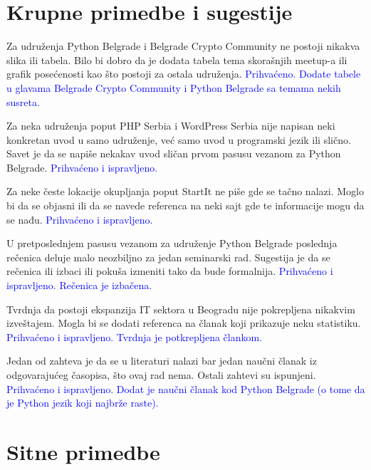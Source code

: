 \documentclass[a4paper]{report}
\newcommand{\odgovor}[1]{\textcolor{blue}{#1}}
\begin{document}
\section{Krupne primedbe i sugestije}

Za udruženja Python Belgrade i Belgrade Crypto Community ne postoji nikakva slika ili tabela. Bilo bi dobro da je dodata tabela tema skorašnjih meetup-a ili grafik posećenosti kao što postoji za ostala udruženja.
\odgovor{Prihvaćeno. Dodate tabele u glavama Belgrade Crypto Community i Python Belgrade sa temama nekih susreta.}

Za neka udruženja poput PHP Serbia i WordPress Serbia nije napisan neki konkretan uvod u samo udruženje, već samo uvod u programski jezik ili slično. Savet je da se napiše nekakav uvod sličan prvom pasusu vezanom za Python Belgrade. 
\odgovor{Prihvaćeno i ispravljeno.}

Za neke česte lokacije okupljanja poput StartIt ne piše gde se tačno nalazi. Moglo bi da se objasni ili da se navede referenca na neki sajt gde te informacije mogu da se nađu. \odgovor{Prihvaćeno i ispravljeno.}

U pretposlednjem pasusu vezanom za udruženje Python Belgrade poslednja rečenica deluje malo neozbiljno za jedan seminarski rad. Sugestija je da se rečenica ili izbaci ili pokuša izmeniti tako da bude formalnija. \odgovor{Prihvaćeno i ispravljeno. Rečenica je izbačena.}

Tvrdnja da postoji ekspanzija IT sektora u Beogradu nije pokrepljena nikakvim izveštajem. Mogla bi se dodati referenca na članak koji prikazuje neku statistiku.
\odgovor{Prihvaćeno i ispravljeno. Tvrdnja je potkrepljena člankom.}

Jedan od zahteva je da se u literaturi nalazi bar jedan naučni članak iz odgovarajućeg časopisa, što ovaj rad nema. Ostali zahtevi su ispunjeni.
\odgovor{Prihvaćeno i ispravljeno. Dodat je naučni članak kod Python Belgrade (o tome da je Python jezik koji najbrže raste).}

\section{Sitne primedbe}
\end{document}
